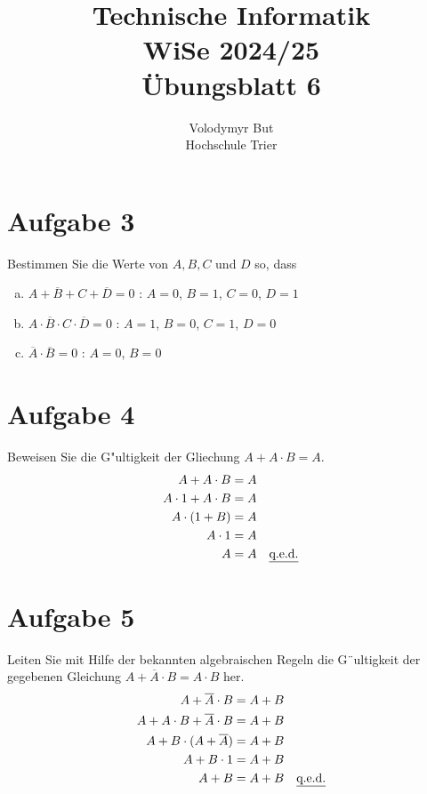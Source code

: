 \documentclass[10pt, oneside]{article}
\title{Technische Informatik\\[10pt]\Large{WiSe 2024/25}\\[15pt]\Large{{\"U}bungsblatt 6}}
\author{Volodymyr But\\[10pt]Hochschule Trier}
\date{}
\begin{document}
\maketitle
\vspace{25px}

\setcounter{section}{2}
\section{Aufgabe 3}

Bestimmen Sie die Werte von $A, B, C$ und $D$ so, dass
\begin{enumerate}[(a)]
    \item $A + \overline{B} + C + \overline{D} = 0$ : $A = 0$, $B = 1$, $C = 0$, $D = 1$
    \item $A \cdot \overline{B} \cdot C \cdot \overline{D} = 0$ : $A = 1$, $B = 0$, $C = 1$, $D = 0$
    \item $\overline{A} \cdot \overline{B} = 0$ : $A = 0$, $B = 0$
\end{enumerate}

\section{Aufgabe 4}

Beweisen Sie die G"ultigkeit der Gliechung $A + A \cdot B = A$.
\begin{align*}
    A + A \cdot B &= A \\
    A \cdot 1 + A \cdot B &= A \\
    A \cdot (1 + B) &= A \\
    A \cdot 1 &= A \\
    A &= A \quad \text{\underline{q.e.d.}}
\end{align*}

\section{Aufgabe 5}

Leiten Sie mit Hilfe der bekannten algebraischen Regeln die G¨ultigkeit der gegebenen
Gleichung $A + \overline{A} \cdot B = A \cdot B$ her.
\begin{align*}
    A + \overline{A} \cdot B &= A + B \\
    A + A \cdot B + \overline{A} \cdot B &= A + B \\
    A + B \cdot (A + \overline{A}) &= A + B \\
    A + B \cdot 1 &= A + B \\
    A + B &= A + B \quad \text{\underline{q.e.d.}}
\end{align*}
\end{document}
